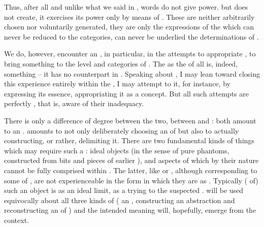 \newp


\pa\label{pa:positing1}
Thus, after all and unlike what we said in 
, words do not give
power.   but does not create, it
exercises its power only by means of . These  
 are neither arbitrarily chosen nor voluntarily generated, they are
only the  expressions of the  which can
never be reduced to the  categories, can never be underlied
the  determinations of . 


We do, however, encounter   an , in
particular, in the attempts to appropriate , to bring
something  to the level and categories of .
The  as the  of all  is, indeed,
something  -- it has no counterpart in . 
Speaking about , I may lean toward closing
this experience entirely within the \hoa, I may attempt to  it, for
instance, by expressing its essence, appropriating it as a concept. But all 
such attempts are perfectly , that is, aware of their inadequacy. 

There is only a difference of degree between the two, between  and : both amount to
 an .  amounts to not only deliberately
choosing an  of  but also to actually constructing, or
  rather, delimiting 
it. There are two fundamental kinds of things which may require such a
 : ideal objects (in the sense of pure phantoms, 
constructed from  bits and pieces of earlier ),
and aspects of  which by their nature cannot be fully comprised
within \hoa. The latter, like  or , although corresponding to some  of , are not
experienceable in the form in which they are  as .
Typically ( of) such an object is  as an ideal
limit, as a  trying to  the suspected
.  will be used equivocally about all three kinds of
 ( an , constructing an abstraction and
reconstructing an  of ) and the intended meaning will,
hopefully, emerge from the context. 

